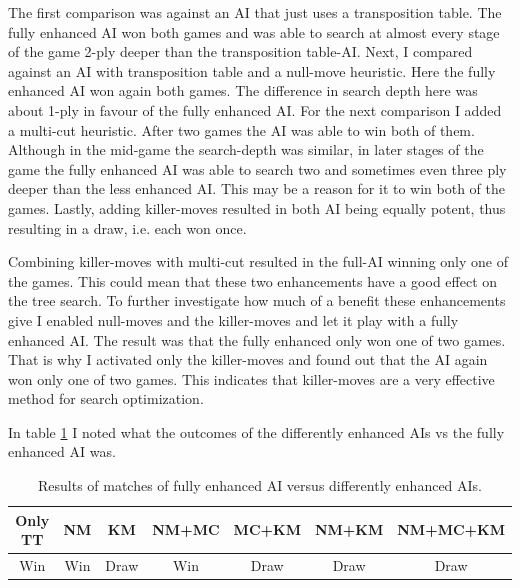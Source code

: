 \documentclass[a4paper]{article}
\begin{document}
The first comparison was against an AI that just uses a transposition table. The fully enhanced AI won both games and was able to search at almost every stage of the game 2-ply deeper than the transposition table-AI.
Next, I compared against an AI with transposition table and a null-move heuristic. Here the fully enhanced AI won again both games. The difference in search depth here was about 1-ply in favour of the fully enhanced AI.
For the next comparison I added a multi-cut heuristic. After two games the AI was able to win both of them. Although in the mid-game the search-depth was similar, in later stages of the game the fully enhanced AI was able to search two and sometimes even three ply deeper than the less enhanced AI. This may be a reason for it to win both of the games.
Lastly, adding killer-moves resulted in both AI being equally potent, thus resulting in a draw, i.e. each won once.

Combining killer-moves with multi-cut resulted in the full-AI winning only one of the games. This could mean that these two enhancements have a good effect on the tree search. To further investigate how much of a benefit these enhancements give I enabled null-moves and the killer-moves and let it play with a fully enhanced AI. The result was that the fully enhanced only won one of two games. That is why I activated only the killer-moves and found out that the AI again won only one of two games. This indicates that killer-moves are a very effective method for search optimization.

In table \ref{resultsTable} I noted what the outcomes of the differently enhanced AIs vs the fully enhanced AI was.

\begin{table}
\begin{tabular}{c|c|c|c|c|c|c}
	Only TT & NM & KM & NM+MC & MC+KM & NM+KM & NM+MC+KM \\
	\hline
	Win & Win & Draw & Win & Draw & Draw & Draw
\end{tabular}
\caption{Results of matches of fully enhanced AI versus differently enhanced AIs.}
\label{resultsTable}
\end{table}




\end{document}
